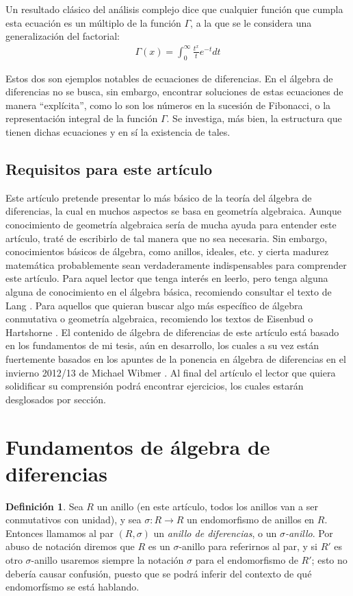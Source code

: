 \documentclass[letterpaper]{article}
\theoremstyle{definition}
\newtheorem{defn}[Satz]{Definici\'on}
\begin{document}
Un resultado cl\'asico del an\'alisis complejo dice que cualquier funci\'on que cumpla esta ecuaci\'on es un m\'ultiplo de la funci\'on $\Gamma$,
a la que se le considera una generalizaci\'on del factorial:
\begin{align*}
\Gamma(x) = \int_0^\infty{\frac{t^x}{t} e^{-t} dt}
\end{align*}

Estos dos son ejemplos notables de ecuaciones de diferencias. En el \'algebra de diferencias no se busca, sin embargo,
encontrar soluciones de estas ecuaciones de manera ``expl\'icita'', como lo son los n\'umeros en la sucesi\'on de Fibonacci,
o la representaci\'on integral de la funci\'on $\Gamma$. Se investiga, m\'as bien, la estructura que tienen dichas ecuaciones y en s\'i la existencia de tales. 

\subsection{Requisitos para este art\'iculo}

Este art\'iculo pretende presentar lo m\'as b\'asico de la teor\'ia del \'algebra de diferencias, la cual en muchos aspectos se basa en geometr\'ia algebraica. Aunque conocimiento de geometr\'ia algebraica ser\'ia de mucha ayuda para entender este art\'iculo, trat\'e de escribirlo
de tal manera que no sea necesaria. Sin embargo, conocimientos b\'asicos de \'algebra, como anillos, ideales, etc. y cierta madurez matem\'atica probablemente sean verdaderamente indispensables para comprender este art\'iculo. 
Para aquel lector que tenga inter\'es en leerlo, pero tenga alguna alguna de conocimiento en el \'algebra b\'asica, recomiendo consultar el texto de Lang \cite{lang}. Para aquellos que quieran buscar algo m\'as espec\'ifico de \'algebra conmutativa o geometr\'ia algebraica, recomiendo los textos de Eisenbud \cite{eisenbud} o Hartshorne \cite{hartshorne}. El contenido de \'algebra de diferencias de este art\'iculo est\'a basado en los fundamentos de mi tesis, a\'un en desarrollo, 
los cuales a su vez est\'an fuertemente basados en los apuntes de la ponencia en \'algebra de diferencias en el invierno 2012/13 de Michael Wibmer \cite{wibmer}.
Al final del art\'iculo el lector que quiera solidificar su comprensi\'on podr\'a encontrar ejercicios, los cuales estar\'an desglosados por secci\'on.
\section{Fundamentos de \'algebra de diferencias}\label{fundamentos}
\begin{defn}
Sea $R$ un anillo (en este art\'iculo, todos los anillos van a ser conmutativos con unidad), y  sea $
\sigma: R \rightarrow R$ un endomorfismo de anillos en $R$. Entonces llamamos al par $(R,\sigma)$ un \emph{anillo de diferencias}, o un $\sigma$\emph{-anillo}. Por abuso de notaci\'on diremos que $R$ es un $\sigma$-anillo  para referirnos al par, y si $R'$ es otro $\sigma$-anillo  usaremos siempre la notaci\'on $\sigma$ para el endomorfismo de $R'$; esto no deber\'ia causar confusi\'on, puesto que se podr\'a inferir del contexto de 
qu\'e endomorf\'ismo se est\'a hablando.
\end{defn}
\end{document}
